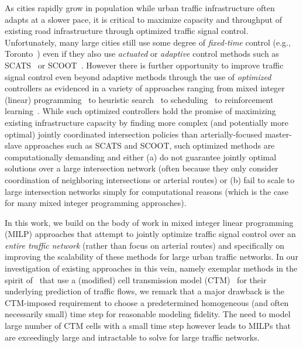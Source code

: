 As cities rapidly grow in population while urban traffic
infrastructure often adapts at a slower pace, it is critical to
maximize capacity and throughput of existing road infrastructure
through optimized traffic signal control.  Unfortunately, many large
cities still use some degree of \emph{fixed-time} control (e.g.,
Toronto~) even if they also use
\emph{actuated} or \emph{adaptive} control methods such as SCATS~
or SCOOT~.  However there is
further opportunity to improve traffic signal control even beyond
adaptive methods through the use of \emph{optimized} controllers as
evidenced in a variety of approaches ranging from mixed integer
(linear)
programming~
to heuristic search~ to
scheduling~ to reinforcement
learning~.  While such optimized controllers
hold the promise of maximizing existing infrastructure capacity by
finding more complex (and potentially more optimal) jointly
coordinated intersection policies than arterially-focused master-slave
approaches such as SCATS and SCOOT, such optimized methods are
computationally demanding
and either (a) do not guarantee jointly optimal solutions over a large
intersection network (often because they only consider coordination of
neighboring intersections or arterial routes) or (b) fail to scale to
large intersection networks simply for computational reasons (which is
the case for many mixed integer programming approaches).

In this work, we build on the body of work in mixed integer linear
programming (MILP) approaches that attempt to jointly optimize traffic
signal control over an \emph{entire traffic network} (rather than
focus on arterial routes) and specifically on improving the
scalability of these methods for large urban traffic networks.  In our
investigation of existing approaches in this vein, namely exemplar
methods in the spirit of~ that
use a (modified) cell transmission model
(CTM)~ for their underlying
prediction of traffic flows, we remark that a major drawback is the
CTM-imposed requirement to choose a predetermined homogeneous (and
often necessarily small) time step for reasonable modeling fidelity.
The need to model large number of CTM cells with a small time step
however leads to MILPs that are exceedingly large and intractable to
solve for large traffic networks.

